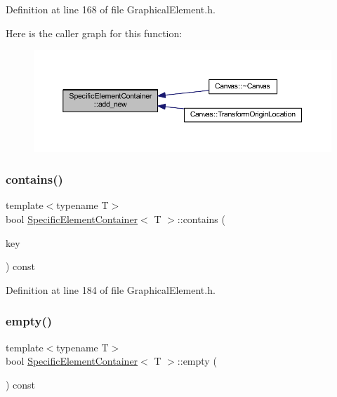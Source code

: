 Definition at line 168 of file Graphical\+Element.\+h.

Here is the caller graph for this function\+:
\nopagebreak
\begin{figure}[H]
\begin{center}
\leavevmode
\includegraphics[width=350pt]{class_specific_element_container_a6a3c2ba0b46445d1504489d5c2ef3530_icgraph}
\end{center}
\end{figure}
\mbox{\label{class_specific_element_container_a55f9c50b8520d9e89aa11a31be58a0f0}} 
\subsubsection{\texorpdfstring{contains()}{contains()}}
{\footnotesize\ttfamily template$<$typename T$>$ \\
bool \hyperlink{class_specific_element_container}{Specific\+Element\+Container}$<$ T $>$\+::contains (\begin{DoxyParamCaption}\item[{const \hyperlink{_graphical_element_8h_ade5fd6c85839a416577ff9de1605141e}{Element\+Key} \&}]{key }\end{DoxyParamCaption}) const\hspace{0.3cm}{\ttfamily [inline]}}



Definition at line 184 of file Graphical\+Element.\+h.

\mbox{\label{class_specific_element_container_aead401f8325d8f15b5d63896f146d46b}} 
\subsubsection{\texorpdfstring{empty()}{empty()}}
{\footnotesize\ttfamily template$<$typename T$>$ \\
bool \hyperlink{class_specific_element_container}{Specific\+Element\+Container}$<$ T $>$\+::empty (\begin{DoxyParamCaption}{ }\end{DoxyParamCaption}) const\hspace{0.3cm}{\ttfamily [inline]}}



